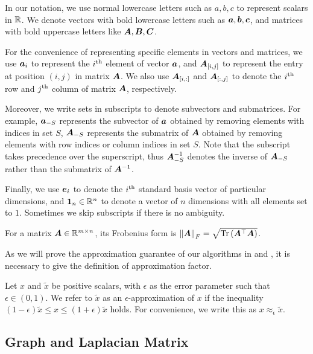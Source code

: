 \documentclass[10pt,journal,compsoc,twocolumn,twoside]{IEEEtran}
\begin{document}
In our notation, we use normal lowercase letters such as \(a,b,c\) to represent scalars in \(\mathbb{R}\). We denote vectors with bold lowercase letters such as \(\boldsymbol{a},\boldsymbol{b},\boldsymbol{c}\), and matrices with bold uppercase letters like \(\boldsymbol{A},\boldsymbol{B},\boldsymbol{C}\).

For the convenience of representing specific elements in vectors and matrices, we use \(\boldsymbol{a}_{i}\) to represent the \({i}^{\rm{th}}\) element of vector \(\boldsymbol{a}\), and \(\boldsymbol{A}_{[i,j]}\) to represent the entry at position \((i,j)\) in matrix \(\boldsymbol{A}\).
We also use \(\boldsymbol{A}_{[i,:]}\) and \(\boldsymbol{A}_{[:,j]}\) to denote the \({i}^{\rm{th}}\) row and \({j}^{\rm{th}}\) column of matrix \(\boldsymbol{A}\), respectively.

Moreover, we write sets in subscripts to denote subvectors and submatrices.
For example, \(\boldsymbol{a}_{-S}\) represents the subvector of \(\boldsymbol{a}\) obtained by removing elements with indices in set \(S\), \(\boldsymbol{A}_{-S}\) represents the submatrix of \(\boldsymbol{A}\) obtained by removing elements with row indices or column indices in set \(S\).
Note that the subscript takes precedence over the superscript, thus \(\boldsymbol{A}_{-S}^{-1}\) denotes the inverse of \(\boldsymbol{A}_{-S}\) rather than the submatrix of \(\boldsymbol{A}^{-1}\).

Finally, we use \(\boldsymbol{e}_i\) to denote the \({i}^{\rm{th}}\) standard basis vector of particular dimensions, and \(\boldsymbol{1}_n\in \mathbb{R}^n\) to denote a vector of \(n\) dimensions with all elements set to \(1\).
Sometimes we skip subscripts if there is no ambiguity.

For a matrix \(\boldsymbol{A}\in\mathbb{R}^{m\times n}\), its Frobenius form is \(\left\Vert\boldsymbol{A}\right\Vert_F=\sqrt{\mathrm{Tr}\left(\boldsymbol{A}^\top\boldsymbol{A}\right)}\).

As we will prove the approximation guarantee of our algorithms in  and , it is necessary to give the definition of approximation factor.

\begin{definition}
    Let \(x\) and \(\tilde{x}\) be positive scalars, with \(\epsilon\) as the error parameter such that \(\epsilon\in(0,1)\). We refer to \(\tilde{x}\) as an \(\epsilon\)-approximation of \(x\) if the inequality \((1-\epsilon)\tilde{x}\le x\le(1+\epsilon)\tilde{x}\) holds. For convenience, we write this as \(x\approx_{\epsilon}\tilde{x}\).
\end{definition}

\subsection{Graph and Laplacian Matrix}\label{sub:lap}
\end{document}
